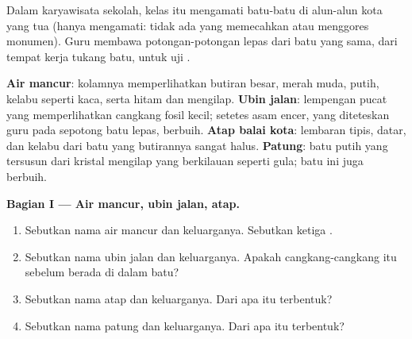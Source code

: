 \begin{problem}
\label{pb:g6:rocks-and-minerals:1}
Dalam karyawisata sekolah, kelas itu mengamati batu-batu di alun-alun kota
yang tua (hanya mengamati: tidak ada yang memecahkan atau menggores
monumen). Guru membawa potongan-potongan lepas dari batu yang sama, dari
tempat kerja tukang batu, untuk uji .

\smallskip
\noindent\textbf{Air mancur}: kolamnya memperlihatkan butiran besar, merah
        muda, putih, kelabu seperti kaca, serta hitam dan mengilap.
\textbf{Ubin jalan}: lempengan pucat yang memperlihatkan cangkang fosil
        kecil; setetes asam encer, yang diteteskan guru pada sepotong batu
        lepas, berbuih.
\textbf{Atap balai kota}: lembaran tipis, datar, dan kelabu dari batu yang
        butirannya sangat halus.
\textbf{Patung}: batu putih yang tersusun dari kristal mengilap yang
        berkilauan seperti gula; batu ini juga berbuih.

\medskip
\noindent\textbf{Bagian I --- Air mancur, ubin jalan, atap.}
\begin{enumerate}
  \item Sebutkan nama  air mancur dan keluarganya. Sebutkan ketiga
        .
  \item Sebutkan nama  ubin jalan dan keluarganya. Apakah
        cangkang-cangkang itu sebelum berada di dalam batu?
  \item Sebutkan nama  atap dan keluarganya. Dari  apa 
        itu terbentuk?
  \item Sebutkan nama  patung dan keluarganya. Dari  apa 
        itu terbentuk?
\end{enumerate}


\end{problem}
